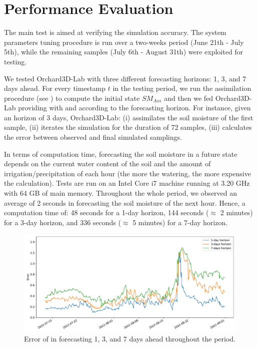 \section{Performance Evaluation}

The main test is aimed at verifying the simulation accuracy.
%
The system parameters tuning procedure is run over a two-weeks period (June 21th - July 5th), while the remaining samples (July 6th - August 31th) were exploited for testing.

We tested Orchard3D-Lab with three different forecasting horizons: 1, 3, and 7 days ahead.
%
For every timestamp $t$ in the testing period, we run the assimilation procedure (see ) to compute the initial state $SM_{Ass}$ and then we fed Orchard3D-Lab providing with \Wt and \It  according to the forecasting horizon.
%
For instance, given an horizon of 3 days, Orchard3D-Lab: (i) assimilates the soil moisture of the first sample, (ii) iterates the simulation for the duration of 72 samples, (iii) calculates the error between observed and final simulated samplings.

In terms of computation time, forecasting the soil moisture in a future state depends on the current water content of the soil and the amount of irrigation/precipitation of each hour (the more the watering, the more expensive the calculation).
%
Tests are run on an Intel Core i7 machine running at 3.20 GHz with 64 GB of main memory.
%
Throughout the whole period, we observed an average of 2 seconds in forecasting the soil moisture of the next hour.
%
Hence, a computation time of: 48 seconds for a 1-day horizon, 144 seconds ($\approx$ 2 minutes) for a 3-day horizon, and 336 seconds ($\approx$ 5 minutes) for a 7-day horizon.

\begin{figure}[t]
    \centering
    \includegraphics[scale=.4]{chapters/physics-aware/orchard/img/forecasting_avg_with_forbidden_sensors.pdf}
    \caption{Error of  in forecasting 1, 3, and 7 days ahead throughout the period.}
    \label{orchard-fig:forecasting_avg}
\end{figure}

